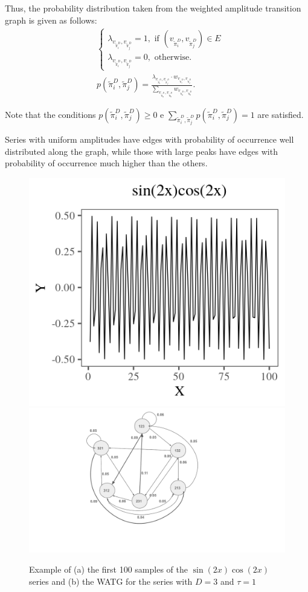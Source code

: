 \documentclass[paper=letter, fontsize=12pt]{article}
\begin{document}
	Thus, the probability distribution taken from the weighted amplitude transition graph is given as follows:	
	\begin{align}
	&\left\{\begin{array}{l}
	\lambda_{v_{\widetilde\pi^D_i}, v_{\widetilde\pi^D_j}} = 1, \text{ if } (v_{\widetilde\pi^D_i}, v_{\widetilde\pi^D_j}) \in {E} \\
	\lambda_{v_{\widetilde\pi^D_i}, v_{\widetilde\pi^D_j}} = 0, \text{ otherwise}.
	\end{array}\right. \\
	&p(\widetilde\pi^D_i, \widetilde\pi^D_j) = \frac{\lambda_{v_{\widetilde\pi^D_i}, v_{\widetilde\pi^D_j}} \cdot w_{v_{\widetilde\pi^D_i}, v_{\widetilde\pi^D_j}}}{\sum_{v_{\widetilde\pi^D_a}, v_{\widetilde\pi^D_b}} w_{v_{\widetilde\pi^D_a}, v_{\widetilde\pi^D_b}}}.
	\end{align}
	
	Note that the conditions $p(\widetilde\pi^D_i, \widetilde\pi^D_j) \ge 0$ e $\sum_{\widetilde\pi^D_i, \widetilde\pi^D_j} p(\widetilde\pi^D_i, \widetilde\pi^D_j) = 1$ are satisfied.
	
	Series with uniform amplitudes have edges with probability of occurrence well distributed along the graph, while those with large peaks have edges with probability of occurrence much higher than the others.
	
	\begin{figure}[hbt]
		\centering
		\includegraphics[width=.45\linewidth]{Figures/plotsincos.png}
		\includegraphics[width=.4\linewidth]{Figures/graph.pdf}
		\caption{Example of (a) the first 100 samples of the $\sin (2x)  \cos (2x)$ series and (b) the WATG for the series with $D = 3$ and $\tau = 1$}\label{fig:series}
	\end{figure} 
	
\end{document}
